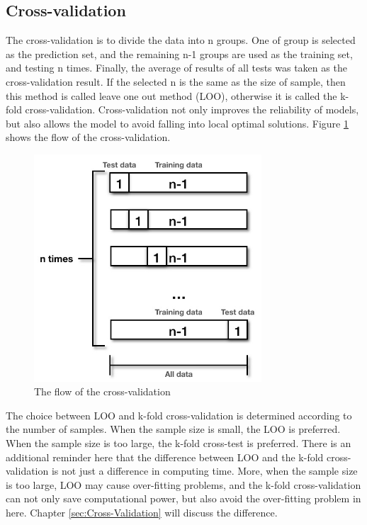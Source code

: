\documentclass[a4paper,12pt,titlepage]{article} %
\numberwithin{equation}{section}  %
\begin{document}
	\subsection{Cross-validation}
	\label{cross-validation}
	The cross-validation is to divide the data into n groups. One of group is selected as the prediction set, and the remaining n-1 groups are used as the training set, and testing n times. Finally, the average of results of all tests was taken as the cross-validation result. If the selected n is the same as the size of sample, then this method is called leave one out method (LOO), otherwise it is called the k-fold cross-validation. Cross-validation not only improves the reliability of models, but also allows the model to avoid falling into local optimal solutions. Figure \ref{fig:cross-validation} shows the flow of the cross-validation.
	\begin{figure}[h]    %
		\centering           %
		\includegraphics[width=8.5cm, angle=0]{cross-validation.png}  %
	    \vspace*{-0.25cm}    %
		\caption{The flow of the cross-validation}          %
		\label{fig:cross-validation}               %
	\end{figure}                        %
	
	The choice between LOO and k-fold cross-validation is determined according to the number of samples. When the sample size is small, the LOO is preferred. When the sample size is too large, the k-fold cross-test is preferred. There is an additional reminder here that the difference between LOO and the k-fold cross-validation is not just a difference in computing time. More, when the sample size is too large, LOO may cause over-fitting problems, and the k-fold cross-validation can not only save computational power, but also avoid the over-fitting problem in here. Chapter \ref{sec:Cross-Validation} will discuss the difference.
	
\end{document}
